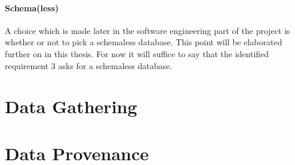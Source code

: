 \paragraph{Schema(less)}
\label{datamodel-schema}

A choice which is made later in the software engineering part of the project is whether or not to pick a schemaless database.
This point will be elaborated further on in this thesis.
For now it will suffice to say that the identified requirement 3 asks for a schemaless database.

\section{Data Gathering}
\label{datamodel-gathering}



\section{Data Provenance}
\label{datamodel-provenance}